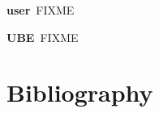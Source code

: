 \documentclass[10pt,a4paper]{scrbook}
\newenvironment{entry}{\par\leavevmode\hangpara{1.5mm}{1}\ignorespaces}{\RaggedRight\par}
\newcommand*{\mainentry}[2]{{\bfseries{#1\label{def:#1}}}~#2\par}
\begin{document}
\begin{appendices}
\begin{entry}
  \mainentry{user}{FIXME}
\end{entry}

\begin{entry}
  \mainentry{UBE}{FIXME}
\end{entry}

\chapter{Bibliography}
{
  \renewcommand*{\bibfont}{\small}
  \printbibliography[title={},heading=none]
}
\printindex

\begin{comment}


\end{comment}

\end{appendices}

\begin{comment}
http://www.rfc-editor.org/pubprocess.html
RFC2223 Instructions to RFC Authors
RFC2119 BCP14 Key words for use in RFCs to Indicate Requirement Levels
RFC3979 BCP79 Intellectual Property Rights in IETF Technology
RFC5378 BCP78 Rights Contributors Provide to the IETF Trust


http://tex.stackexchange.com/questions/36307/formatting-back-references-in-bibliography
http://www.cs.columbia.edu/irt/software/l2x/ l2x -- conversion from LaTeX to other formats Version 1.13
http://ftp.gwdg.de/pub/ctan/support/l2x/
http://tools.ietf.org/tools/xml2rfc2

http://www.zisc.ethz.ch/events/2003-2011/ISC2006Slides/FederrathZISCTalk.pdf

Professorliste
Dr. Christoph Sprenger (Part I)
-Prof. David Basin
Gregory Demay
Peter Gazi
Dr. Srdjan Marinovic
Dr. Sasa Radomirovic
Dr. Ralf Sasse

T. Hoefler
A. Perrig 
-Dr. Jan Camenisch (Keine Berechtigung)

-Srdjan Capkun (Keine Kapazität)
-David Basin  (Keine Kapazität)
\end{comment}
\end{document}
